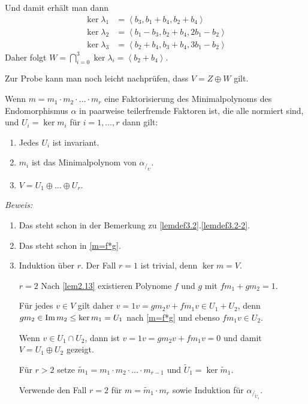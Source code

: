 Und damit erhält man dann
\begin{align*}
    \ker \lambda_1 & = \left\langle b_3, b_1 + b_4, b_2 + b_4 \right\rangle \\
    \ker \lambda_2 & = \left\langle b_1 - b_3, b_2 + b_4, 2b_1 - b_2 \right\rangle\\
    \ker \lambda_3 & = \left\langle b_2 + b_4, b_3 + b_4, 3b_1 - b_2 \right\rangle
\end{align*}
Daher folgt $W = \bigcap\limits_{i = 0}^3 \ker \lambda_i = \left\langle b_2 + b_4 \right\rangle$.

Zur Probe kann man noch leicht nachprüfen, dass $V = Z \oplus W$ gilt.


\begin{mysatz}
    Wenn $m = m_1 \cdot m_2 \cdot \ldots \cdot m_r$ eine Faktorisierung des Minimalpolynoms des Endomorphismus $\alpha$ in paarweise teilerfremde Faktoren ist,
    die alle normiert sind, und $U_i = \ker m_i$ für $i = 1, \ldots, r$ dann gilt:
    \begin{enumerate}
        \item Jedes $U_i$ ist invariant.
        \item $m_i$ ist das Minimalpolynom von $\alpha_{/_U}$.
        \item $V = U_1 \oplus \ldots \oplus U_r$.
    \end{enumerate}

    \textit{Beweis:}
    \begin{enumerate}
        \item Das steht schon in der Bemerkung zu \ref{lemdef3.2}.\ref{lemdef3.2-2}.
        \item Das steht schon in \ref{m=f*g}.
        \item Induktion über $r$. Der Fall $r=1$ ist trivial, denn $\ker m =V$.

            $r=2$ Nach \ref{lem2.13} existieren Polynome $f$ und $g$ mit $f m_1 + g m_2 = 1$.

            Für jedes $v \in V$ gilt daher $v = 1 v = g m_2 v + f m_1 v \in U_1+U_2$, denn $g m_2\in \text{Im}\, m_2 \leq \ker m_1 = U_1$ nach \ref{m=f*g} und ebenso $fm_1v\in U_2$.

            Wenn $v \in U_1 \cap U_2$, dann ist $v = 1v = g m_2v + f m_1 v = 0$ und damit $V = U_1 \oplus U_2$ gezeigt.

            Für $r>2$ setze $\tilde{m}_1 = m_1 \cdot m_2 \cdot \ldots \cdot m_{r-1}$ und $\tilde{U}_1 = \ker \tilde{m}_1$.

            Verwende den Fall $r = 2$ für $m = \tilde{m}_1 \cdot m_{r}$ sowie Induktion für $\alpha_{/_{\tilde{U}_1}}$.
    \end{enumerate}
\end{mysatz}

